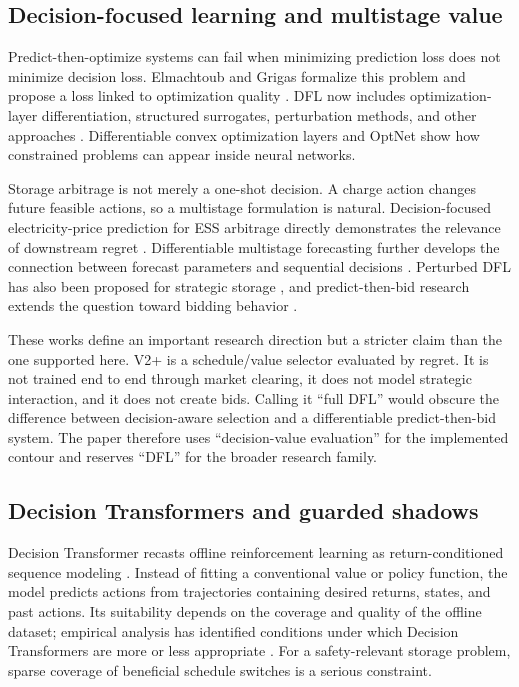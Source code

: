 \subsection{Decision-focused learning and multistage value}

Predict-then-optimize systems can fail when minimizing prediction loss does not minimize decision loss. Elmachtoub and Grigas formalize this problem and propose a loss linked to optimization quality \cite{elmachtoub2022spo}. DFL now includes optimization-layer differentiation, structured surrogates, perturbation methods, and other approaches \cite{mandi2024dfl}. Differentiable convex optimization layers \cite{agrawal2019cvxpylayers} and OptNet \cite{amos2017optnet} show how constrained problems can appear inside neural networks.

Storage arbitrage is not merely a one-shot decision. A charge action changes future feasible actions, so a multistage formulation is natural. Decision-focused electricity-price prediction for ESS arbitrage directly demonstrates the relevance of downstream regret \cite{sang2022essdfl}. Differentiable multistage forecasting further develops the connection between forecast parameters and sequential decisions \cite{persak2024multistage}. Perturbed DFL has also been proposed for strategic storage \cite{yi2024perturbed}, and predict-then-bid research extends the question toward bidding behavior \cite{yi2025predictbid}.

These works define an important research direction but a stricter claim than the one supported here. V2+ is a schedule/value selector evaluated by regret. It is not trained end to end through market clearing, it does not model strategic interaction, and it does not create bids. Calling it ``full DFL'' would obscure the difference between decision-aware selection and a differentiable predict-then-bid system. The paper therefore uses ``decision-value evaluation'' for the implemented contour and reserves ``DFL'' for the broader research family.

\subsection{Decision Transformers and guarded shadows}

Decision Transformer recasts offline reinforcement learning as return-conditioned sequence modeling \cite{chen2021dt}. Instead of fitting a conventional value or policy function, the model predicts actions from trajectories containing desired returns, states, and past actions. Its suitability depends on the coverage and quality of the offline dataset; empirical analysis has identified conditions under which Decision Transformers are more or less appropriate \cite{bhargava2023whendt}. For a safety-relevant storage problem, sparse coverage of beneficial schedule switches is a serious constraint.

